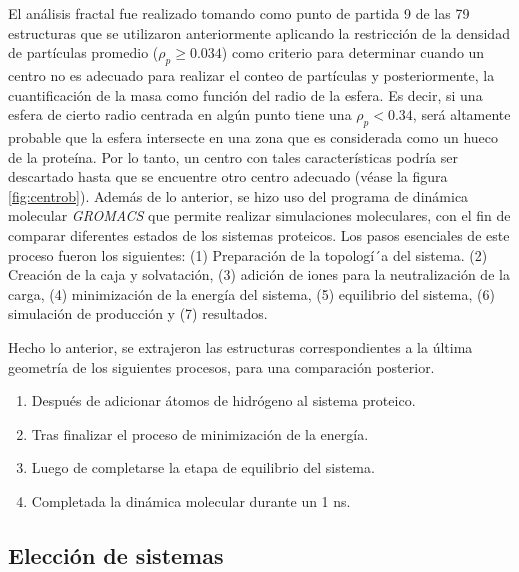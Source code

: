  	
 	El an\'{a}lisis fractal fue realizado tomando como punto de partida 9 de las 79 estructuras que se utilizaron anteriormente aplicando la restricci\'{o}n de la densidad de part\'{i}culas  promedio ($\rho_{p} \geq 0.034$) como criterio para determinar cuando un centro no es adecuado para realizar el conteo de part\'{i}culas y posteriormente, la cuantificaci\'{o}n de la masa como funci\'{o}n del radio de la esfera. Es decir, si una esfera de cierto radio centrada en alg\'{u}n punto tiene una $\rho_{p} < 0.34$, ser\'{a} altamente probable que la esfera intersecte en una zona que es considerada como un hueco de la prote\'{i}na. Por lo tanto, un centro con tales caracter\'{i}sticas podr\'{i}a ser descartado hasta que se encuentre otro centro adecuado (v\'{e}ase la figura \ref{fig:centrob}). Adem\'{a}s de lo anterior, se hizo uso del programa de din\'{a}mica molecular \textit{GROMACS}\cite{Lemkul2024, Abraham2015} que permite realizar simulaciones moleculares, con el fin de comparar diferentes estados de los sistemas proteicos. Los pasos esenciales de este proceso fueron los siguientes: (1) Preparaci\'{o}n de la topolog\'{i´}a del sistema. (2) Creaci\'{o}n de la caja y solvataci\'{o}n, (3) adici\'{o}n de iones para la neutralizaci\'{o}n de la carga, (4) minimizaci\'{o}n de la energ\'{i}a del sistema, (5) equilibrio del sistema, (6) simulaci\'{o}n de producci\'{o}n y (7) resultados.
 	
 	
 	
 	Hecho lo anterior, se extrajeron las estructuras correspondientes a la última 
 	geometría de los siguientes procesos, para una comparación posterior.
 	
 	\begin{enumerate}
 		\item Despu\'{e}s de adicionar \'{a}tomos de hidr\'{o}geno al sistema proteico. 
 		\item Tras finalizar el proceso de minimizaci\'{o}n de la energ\'{i}a.
 		\item Luego de completarse la etapa de equilibrio del sistema.
 		\item Completada la din\'{a}mica molecular durante un 1 ns.
 	\end{enumerate}
 	
 	
 	\subsection{Elecci\'{o}n de sistemas}
 	
